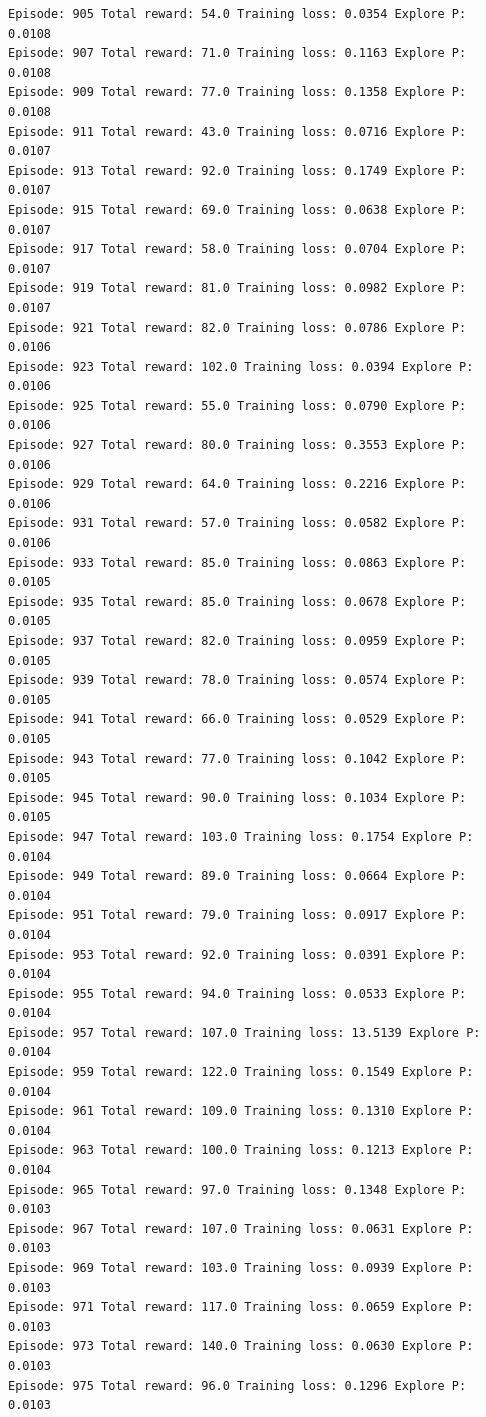 \documentclass[11pt]{article}
\begin{document}
\begin{Verbatim}[commandchars=\\\{\}]
Episode: 905 Total reward: 54.0 Training loss: 0.0354 Explore P: 0.0108
Episode: 907 Total reward: 71.0 Training loss: 0.1163 Explore P: 0.0108
Episode: 909 Total reward: 77.0 Training loss: 0.1358 Explore P: 0.0108
Episode: 911 Total reward: 43.0 Training loss: 0.0716 Explore P: 0.0107
Episode: 913 Total reward: 92.0 Training loss: 0.1749 Explore P: 0.0107
Episode: 915 Total reward: 69.0 Training loss: 0.0638 Explore P: 0.0107
Episode: 917 Total reward: 58.0 Training loss: 0.0704 Explore P: 0.0107
Episode: 919 Total reward: 81.0 Training loss: 0.0982 Explore P: 0.0107
Episode: 921 Total reward: 82.0 Training loss: 0.0786 Explore P: 0.0106
Episode: 923 Total reward: 102.0 Training loss: 0.0394 Explore P: 0.0106
Episode: 925 Total reward: 55.0 Training loss: 0.0790 Explore P: 0.0106
Episode: 927 Total reward: 80.0 Training loss: 0.3553 Explore P: 0.0106
Episode: 929 Total reward: 64.0 Training loss: 0.2216 Explore P: 0.0106
Episode: 931 Total reward: 57.0 Training loss: 0.0582 Explore P: 0.0106
Episode: 933 Total reward: 85.0 Training loss: 0.0863 Explore P: 0.0105
Episode: 935 Total reward: 85.0 Training loss: 0.0678 Explore P: 0.0105
Episode: 937 Total reward: 82.0 Training loss: 0.0959 Explore P: 0.0105
Episode: 939 Total reward: 78.0 Training loss: 0.0574 Explore P: 0.0105
Episode: 941 Total reward: 66.0 Training loss: 0.0529 Explore P: 0.0105
Episode: 943 Total reward: 77.0 Training loss: 0.1042 Explore P: 0.0105
Episode: 945 Total reward: 90.0 Training loss: 0.1034 Explore P: 0.0105
Episode: 947 Total reward: 103.0 Training loss: 0.1754 Explore P: 0.0104
Episode: 949 Total reward: 89.0 Training loss: 0.0664 Explore P: 0.0104
Episode: 951 Total reward: 79.0 Training loss: 0.0917 Explore P: 0.0104
Episode: 953 Total reward: 92.0 Training loss: 0.0391 Explore P: 0.0104
Episode: 955 Total reward: 94.0 Training loss: 0.0533 Explore P: 0.0104
Episode: 957 Total reward: 107.0 Training loss: 13.5139 Explore P: 0.0104
Episode: 959 Total reward: 122.0 Training loss: 0.1549 Explore P: 0.0104
Episode: 961 Total reward: 109.0 Training loss: 0.1310 Explore P: 0.0104
Episode: 963 Total reward: 100.0 Training loss: 0.1213 Explore P: 0.0104
Episode: 965 Total reward: 97.0 Training loss: 0.1348 Explore P: 0.0103
Episode: 967 Total reward: 107.0 Training loss: 0.0631 Explore P: 0.0103
Episode: 969 Total reward: 103.0 Training loss: 0.0939 Explore P: 0.0103
Episode: 971 Total reward: 117.0 Training loss: 0.0659 Explore P: 0.0103
Episode: 973 Total reward: 140.0 Training loss: 0.0630 Explore P: 0.0103
Episode: 975 Total reward: 96.0 Training loss: 0.1296 Explore P: 0.0103

\end{Verbatim}
\end{document}
